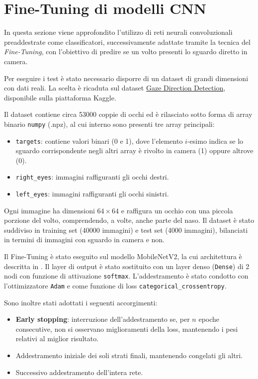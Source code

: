 \documentclass[12pt,a4paper,openright,twoside]{book}
\begin{document}
\section{Fine-Tuning di modelli CNN}
\label{chap:mobilenetv2_ft}

In questa sezione viene approfondito l'utilizzo di reti neurali convoluzionali preaddestrate come classificatori, successivamente adattate tramite la tecnica del \textit{Fine-Tuning}, con l'obiettivo di predire se un volto presenti lo sguardo diretto in camera.  

Per eseguire i test è stato necessario disporre di un dataset di grandi dimensioni con dati reali. La scelta è ricaduta sul dataset \href{https://www.kaggle.com/datasets/estopadilla/gaze-direction-detection}{Gaze Direction Detection}, disponibile sulla piattaforma Kaggle.  

Il dataset contiene circa 53000 coppie di occhi ed è rilasciato sotto forma di array binario \texttt{numpy} (.npz), al cui interno sono presenti tre array principali:
\begin{itemize}
    \item \texttt{targets}: contiene valori binari (0 e 1), dove l'elemento $i$-esimo indica se lo sguardo corrispondente negli altri array è rivolto in camera (1) oppure altrove (0).
    \item \texttt{right\_eyes}: immagini raffiguranti gli occhi destri.
    \item \texttt{left\_eyes}: immagini raffiguranti gli occhi sinistri.
\end{itemize}

Ogni immagine ha dimensioni \(64 \times 64\) e raffigura un occhio con una piccola porzione del volto, comprendendo, a volte, anche parte del naso.  
Il dataset è stato suddiviso in training set (40000 immagini) e test set (4000 immagini), bilanciati in termini di immagini con sguardo in camera e non.  

Il Fine-Tuning è stato eseguito sul modello MobileNetV2, la cui architettura è descritta in \cite{Sandler2018MobileNetV2IR}. Il layer di output è stato sostituito con un layer denso (\texttt{Dense}) di 2 nodi con funzione di attivazione \texttt{softmax}. L'addestramento è stato condotto con l'ottimizzatore \texttt{Adam} e come funzione di loss \texttt{categorical\_crossentropy}.  

Sono inoltre stati adottati i seguenti accorgimenti:
\begin{itemize}
    \item \textbf{Early stopping}: interruzione dell'addestramento se, per $n$ epoche consecutive, non si osservano miglioramenti della loss, mantenendo i pesi relativi al miglior risultato.
    \item Addestramento iniziale dei soli strati finali, mantenendo congelati gli altri.
    \item Successivo addestramento dell'intera rete.
\end{itemize}
\end{document}
